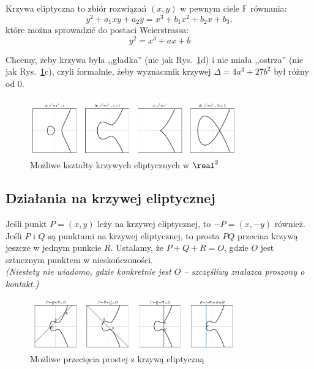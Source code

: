 \begin{definition}
    Krzywa eliptyczna to zbiór rozwiązań \( (x, y) \) w pewnym ciele \( \mathbb{F} \) równania:
    \[
        y^2 + a_1xy + a_2y = x^3 + b_1x^2 + b_2x + b_3,
    \]
    które można sprowadzić do postaci Weierstrassa:
    \[
        y^2 = x^3 + ax + b
    \]
\end{definition}

Chcemy, żeby krzywa była ,,gładka'' (nie jak Rys.~\ref{fig:elliptic_curves}d) i nie miała ,,ostrza'' (nie jak Rys.~\ref{fig:elliptic_curves}c), czyli formalnie, żeby wyznacznik krzywej \( \Delta = 4a^3 + 27b^2 \) był różny od 0.

\begin{figure}[H]
\centering
    \includegraphics[width=0.8\textwidth]{img/elliptic_curves}
    \caption{Możliwe kształty krzywych eliptycznych w \( \real^2 \)}
    \label{fig:elliptic_curves}
\end{figure}

\subsection{Działania na krzywej eliptycznej}
Jeśli punkt \( P = (x, y) \) leży na krzywej eliptycznej, to \( -P = (x, -y) \) również.
Jeśli \( P \) i \( Q \) są punktami na krzywej eliptycznej, to prosta \( PQ \) przecina krzywą jeszcze w jednym punkcie \( R \).
Ustalamy, że \( P + Q + R = O \), gdzie \( O \) jest sztucznym punktem w nieskończoności. \\
\textit{(Niestety nie wiadomo, gdzie konkretnie jest \( O \) -- szczęśliwy znalazca proszony o kontakt.)}

\begin{figure}[H]
\centering
    \includegraphics[width=0.8\textwidth]{img/elliptic_curves_lines}
    \caption{Możliwe przecięcia prostej z krzywą eliptyczną}
    \label{fig:elliptic_lines}
\end{figure}

